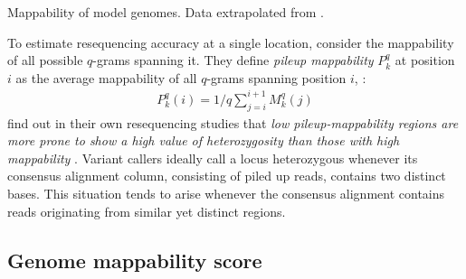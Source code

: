 
\begin{table}[h]
\begin{center}
\caption[Mappability of model genomes]{Mappability of model genomes. Data extrapolated from \citep{Derrien2012}.}
\sffamily

\end{center}
\label{tab:mappability}
\end{table}

To estimate resequencing accuracy at a single location, \citeauthor{Derrien2012} consider the mappability of all possible $q$-grams spanning it.
They define \emph{pileup mappability} $P^q_k$ at position $i$ as the average mappability of all $q$-grams spanning position $i$, \ie:
\begin{eqnarray}
P^q_k(i) = 1/q \sum_{j=i}^{i+1}{M^q_k(j)}
\end{eqnarray}
\citeauthor{Derrien2012} find out in their own resequencing studies that \emph{low pileup-mappability regions are more prone to show a high value of heterozygosity than those with high mappability} \citep{Derrien2012}.
Variant callers ideally call a locus heterozygous whenever its consensus alignment column, consisting of piled up reads, contains two distinct bases.
This situation tends to arise whenever the consensus alignment contains reads originating from similar yet distinct regions.

\subsection{Genome mappability score}

